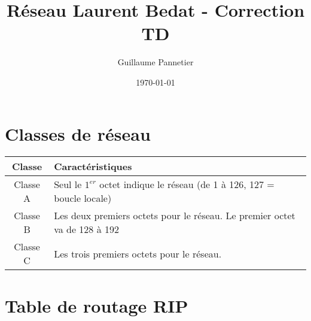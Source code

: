 \documentclass{article}
\begin{document}
\title{
		Réseau Laurent Bedat - Correction TD
	}
\author{Guillaume Pannetier}
\date{\today}

\maketitle

\section{Classes de réseau}

\begin{center}
	\begin{supertabular}{|c|l|}
		\hline
		\textbf{Classe} & \textbf{Caractéristiques} \\
		
		\hline
		Classe A & Seul le $1^{er}$ octet indique le réseau (de 1 à 126, 127 = boucle locale) \\
		
		\hline
		Classe B & Les deux premiers octets pour le réseau. Le premier octet va de 128 à 192 \\
		
		\hline
		Classe C & Les trois premiers octets pour le réseau.\\

		\hline		
	\end{supertabular}
\end{center}


\section{Table de routage RIP}
\end{document}
